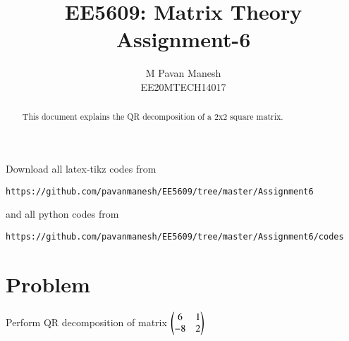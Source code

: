 \documentclass[journal,12pt,twocolumn]{IEEEtran}
\begin{document}
\makeatletter
{}
\makeatother
\let\StandardTheFigure\thefigure
\let\vec\mathbf
\renewcommand{\thefigure}{\theproblem}
\def\putbox#1#2#3{\makebox[0in][l]{\makebox[#1][l]{}\raisebox{\baselineskip}[0in][0in]{\raisebox{#2}[0in][0in]{#3}}}}
     \def\rightbox#1{\makebox[0in][r]{#1}}
     \def\centbox#1{\makebox[0in]{#1}}
     \def\topbox#1{\raisebox{-\baselineskip}[0in][0in]{#1}}
     \def\midbox#1{\raisebox{-0.5\baselineskip}[0in][0in]{#1}}
\vspace{3cm}
\title{EE5609: Matrix Theory\\
          Assignment-6\\}
\author{M Pavan Manesh\\
EE20MTECH14017 }
\maketitle
\newpage
\bigskip
\renewcommand{\thefigure}{\theenumi}
\renewcommand{\thetable}{\theenumi}
\begin{abstract}
This document explains the QR decomposition of a 2x2 square matrix.
\end{abstract}
Download all latex-tikz codes from 
%
\begin{lstlisting}
https://github.com/pavanmanesh/EE5609/tree/master/Assignment6
\end{lstlisting}
and all python codes from 
\begin{lstlisting}
https://github.com/pavanmanesh/EE5609/tree/master/Assignment6/codes
\end{lstlisting}
%
\section{Problem}
Perform QR decomposition of matrix $\begin{pmatrix}6&1\\-8&2\end{pmatrix}$
\end{document}
